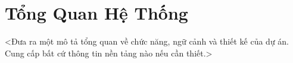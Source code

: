 
\clearpage

\section{Tổng Quan Hệ Thống}
<Đưa ra một mô tả tổng quan về chức năng, ngữ cảnh và thiết kế của dự án. Cung cấp bất cứ 
thông tin nền tảng nào nếu cần thiết.>